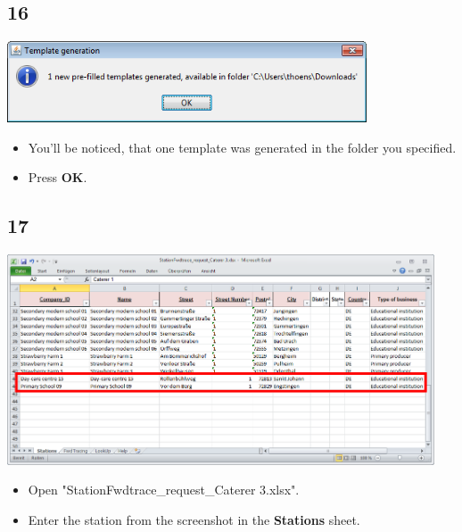 \documentclass{beamer}
\begin{document}
\subsection{16}
\begin{frame}
	\begin{center}
  		\includegraphics[width=0.8\textwidth]{16.png}
	\end{center}
	\begin{itemize}
		\item You'll be noticed, that one template was generated in the folder you specified.
		\item Press \textbf{OK}.
	\end{itemize}
\end{frame}

\subsection{17}
\begin{frame}
	\begin{center}
  		\includegraphics[width=0.95\textwidth]{17.png}
	\end{center}
	\begin{itemize}
		\item Open "StationFwdtrace\_request\_Caterer 3.xlsx".
		\item Enter the station from the screenshot in the \textbf{Stations} sheet.
	\end{itemize}
\end{frame}
\end{document}
